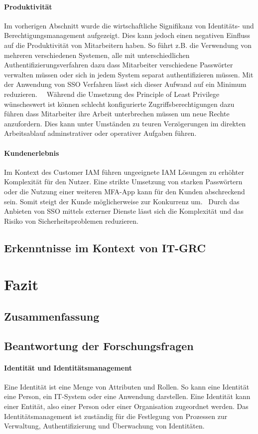 \documentclass[11pt]{article}
\begin{document}
\paragraph{Produktivität}
Im vorherigen Abschnitt wurde die wirtschaftliche Signifikanz von Identitäts- und Berechtigungsmanagement aufgezeigt. Dies kann jedoch einen negativen Einfluss auf die Produktivität von Mitarbeitern haben. So führt z.B. die Verwendung von mehreren verschiedenen Systemen, alle mit unterschiedlichen Authentifizierungsverfahren dazu dass Mitarbeiter verschiedene Passwörter verwalten müssen oder sich in jedem System separat authentifizieren müssen. Mit der Anwendung von SSO Verfahren lässt sich dieser Aufwand auf ein Minimum reduzieren.~\cite{radha2012survey}~\cite{haag2012selecting} Während die Umsetzung des Principle of Least Privilege wünscheswert ist können schlecht konfigurierte Zugriffsberechtigungen dazu führen dass Mitarbeiter ihre Arbeit unterbrechen müssen um neue Rechte anzufordern. Dies kann unter Umständen zu teuren Verzögerungen im direkten Arbeitsablauf adminstrativer oder operativer Aufgaben führen.~\cite{weishaupl2015towards}
\paragraph{Kundenerlebnis}
Im Kontext des Customer IAM führen ungeeignete IAM Lösungen zu erhöhter Komplexität für den Nutzer. Eine strikte Umsetzung von starken Passwörtern oder die Nutzung einer weiteren MFA-App kann für den Kunden abschreckend sein. Somit steigt der Kunde möglicherweise zur Konkurrenz um.~\cite{azhar2014economics} Durch das Anbieten von SSO mittels externer Dienste lässt sich die Komplexität und das Risiko von Sicherheitsproblemen reduzieren.
\subsection{Erkenntnisse im Kontext von IT-GRC}
\section{Fazit}
\subsection{Zusammenfassung}
\subsection{Beantwortung der Forschungsfragen}
\paragraph{Identität und Identitätsmanagement}
Eine Identität ist eine Menge von Attributen und Rollen. So kann eine Identität eine Person, ein IT-System oder eine Anwendung darstellen. Eine Identität kann einer Entität, also einer Person oder einer Organisation zugeordnet werden. Das Identitätsmanagement ist zuständig für die Festlegung von Prozessen zur Verwaltung, Authentifizierung und Überwachung von Identitäten.~\cite{tsolkas2017}~\cite{benantar2005access}
\end{document}
